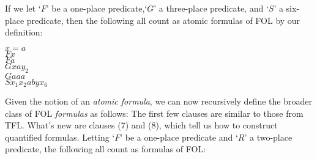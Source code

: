 If we let `$F$' be a one-place predicate,`$G$' a three-place predicate, and `$S$' a six-place predicate, then the following all count as atomic formulas of FOL by our definition:
	\begin{center}
		$x = a$\\
		$Fx$\\
		$Fa$\\
		$Gxay_{2}$\\
		$Gaaa$\\
		$Sx_1 x_2 a b y x_6$\\
	\end{center}
Given the notion of an \emph{atomic formula}, we can now recursively define the broader class of FOL \emph{formulas} as follows:
The first few clauses are similar to those from TFL.  What's new are clauses (7) and (8), which tell us how to construct quantified formulas.  Letting `$F$' be a one-place predicate and `$R$' a two-place predicate, the following all count as formulas of FOL:

